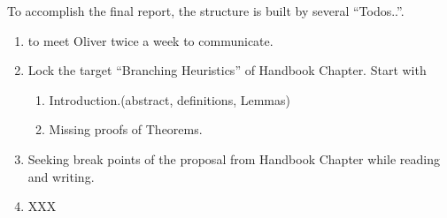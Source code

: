 \documentclass{article}
\begin{document}
To accomplish the final report, the structure is built by several ``Todos..''.

  \begin{enumerate}
    \item to meet Oliver twice a week to communicate.
    \item Lock the target ``Branching Heuristics'' of Handbook Chapter. Start with
    \begin{enumerate}
      \item Introduction.(abstract, definitions, Lemmas)
      \item Missing proofs of Theorems.
    \end{enumerate}
    \item Seeking break points of the proposal from Handbook Chapter while reading and writing.
    
    \item XXX
  \end{enumerate}
  
\end{document}

